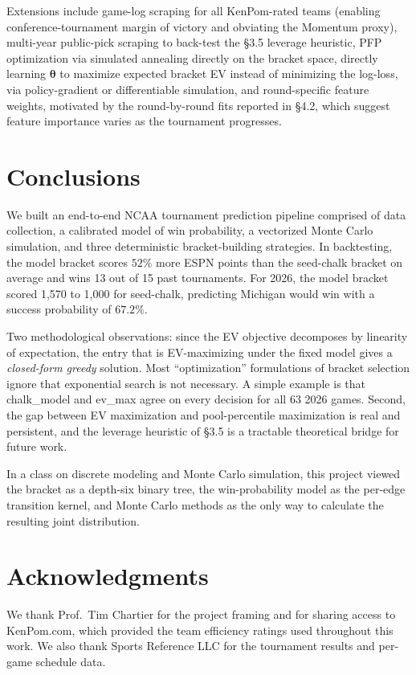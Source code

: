 \documentclass[12pt]{article}
\begin{document}
Extensions include game-log scraping for all KenPom-rated teams (enabling conference-tournament margin of victory and obviating the Momentum proxy), multi-year public-pick scraping to back-test the \S3.5 leverage heuristic, PFP optimization via simulated annealing directly on the bracket space, directly learning $\boldsymbol{\theta}$ to maximize expected bracket EV instead of minimizing the log-loss, via policy-gradient or differentiable simulation, and round-specific feature weights, motivated by the round-by-round fits reported in \S4.2, which suggest feature importance varies as the tournament progresses.

\section{Conclusions}

We built an end-to-end NCAA tournament prediction pipeline comprised of data collection, a calibrated model of win probability, a vectorized Monte Carlo simulation, and three deterministic bracket-building strategies. In backtesting, the model bracket scores $52\%$ more ESPN points than the seed-chalk bracket on average and wins 13 out of 15 past tournaments. For 2026, the model bracket scored 1{,}570 to 1{,}000 for seed-chalk, predicting Michigan would win with a success probability of $67.2\%$.

Two methodological observations: since the EV objective decomposes by linearity of expectation, the entry that is EV-maximizing under the fixed model gives a \emph{closed-form greedy} solution. Most ``optimization'' formulations of bracket selection ignore that exponential search is not necessary. A simple example is that chalk\_model and ev\_max agree on every decision for all 63 2026 games. Second, the gap between EV maximization and pool-percentile maximization is real and persistent, and the leverage heuristic of \S3.5 is a tractable theoretical bridge for future work.

In a class on discrete modeling and Monte Carlo simulation, this project viewed the bracket as a depth-six binary tree, the win-probability model as the per-edge transition kernel, and Monte Carlo methods as the only way to calculate the resulting joint distribution.

\section*{Acknowledgments}

We thank Prof.\ Tim Chartier for the project framing and for sharing access to KenPom.com, which provided the team efficiency ratings used throughout this work. We also thank Sports Reference LLC for the tournament results and per-game schedule data.
\end{document}
